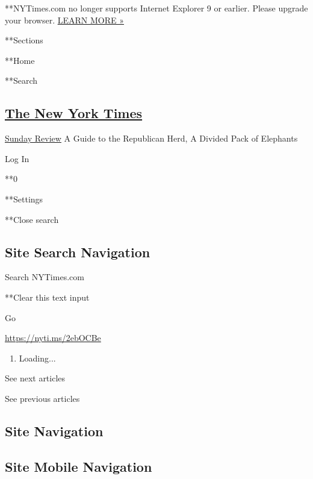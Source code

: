  **NYTimes.com no longer supports Internet Explorer 9 or earlier. Please
upgrade your browser.
\href{http://www.nytimes3xbfgragh.onion/content/help/site/ie9-support.html}{LEARN
MORE »}

**Sections

**Home

**Search

\hypertarget{the-new-york-times}{%
\subsection{\texorpdfstring{\href{http://www.nytimes3xbfgragh.onion/}{The
New York Times}}{The New York Times}}\label{the-new-york-times}}


\href{https://www.nytimes3xbfgragh.onion/pages/opinion/index.html\#sundayreview}{Sunday
Review} \textbar{}A Guide to the Republican Herd, A Divided Pack of
Elephants

Log In

**0

**Settings

**Close search

\hypertarget{site-search-navigation}{%
\subsection{Site Search Navigation}\label{site-search-navigation}}

Search NYTimes.com

**Clear this text input

Go

\url{https://nyti.ms/2ebOCBe}

\begin{enumerate}
\def\labelenumi{\arabic{enumi}.}
\item
  Loading...
\end{enumerate}

See next articles

See previous articles

\hypertarget{site-navigation}{%
\subsection{Site Navigation}\label{site-navigation}}

\hypertarget{site-mobile-navigation}{%
\subsection{Site Mobile Navigation}\label{site-mobile-navigation}}

